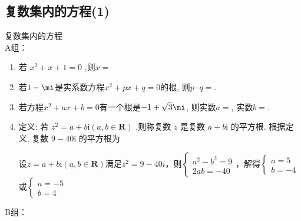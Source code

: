\subsection{复数集内的方程(1)}
\zsd 复数集内的方程 \\
A组：
\begin{enumerate}
    \item 若 $ {x}^{2} + x + 1 = 0 $ ,则$x = $
    \item 若$1-\mi$是实系数方程$x^2+px+q=0$的根, 则$p\cdot q=$. 
    \item 若方程$x^2+ax+b=0$有一个根是$-1+\sqrt{3}\mi$, 则实数$a=$, 实数$b=$. 
    \item 定义: 若 $ {z}^{2} = a + b\mathrm{i}\left( {a,b \in  \mathbf{R}}\right) $ ,则称复数 $ z $ 是复数 $ a + b\mathrm{i} $ 的平方根. 根据定义, 复数 $ 9 - {40}\mathrm{i} $ 的平方根为
    \begin{jieda}
        设$z = a + b\mathrm{i}\left( {a,b \in  \mathbf{R}}\right) $满足$z^2 = 9-40i$，则$\left\{\begin{array}{l}
             a^2-b^2 = 9 \\
             2ab = -40
        \end{array}\right.$，解得$\left\{\begin{array}{l}
             a = 5 \\
             b = -4
        \end{array}\right.$或$\left\{\begin{array}{l}
             a = -5 \\
             b = 4
        \end{array}\right.$
    \end{jieda}
\end{enumerate}
B组：
